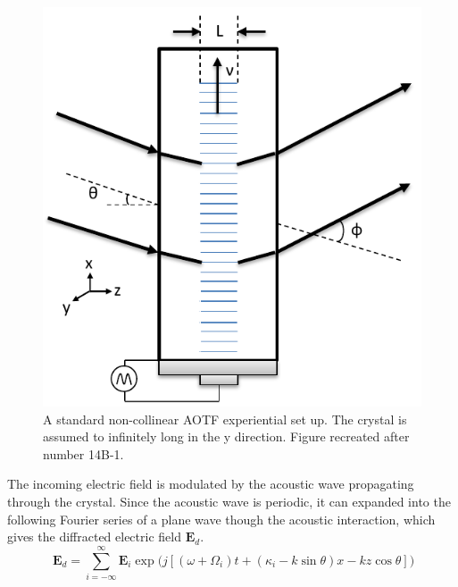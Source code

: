 \begin{figure}[h!]
    \begin{center}
    \includegraphics{./Images/3-1-AOTFExperimentSetUp.pdf}
    \caption[AOTF Experimental Set Up]{A standard non-collinear AOTF experiential set up. The crystal is assumed to infinitely long in the y direction. Figure recreated after \cite{Guenther1990} number 14B-1.}
    \label{fig:3.1:AOTFExperimentalSetUp}
    \end{center}
\end{figure}

The incoming electric field is modulated by the acoustic wave propagating through the crystal. Since the acoustic wave is periodic, it can expanded into the following Fourier series of a plane wave though the acoustic interaction, which gives the diffracted electric field $\mathbf{E}_{d}$.
\begin{equation}
    \ \mathbf{E}_{d} = \sum_{i=-\infty}^{\infty}\mathbf{E}_{i}\exp{(j[(\omega+\Omega_{i})t+(\kappa_{i}-k\sin\theta)x-kz\cos\theta]})
    \label{eqn:3.1:modulatedEField}
\end{equation}

